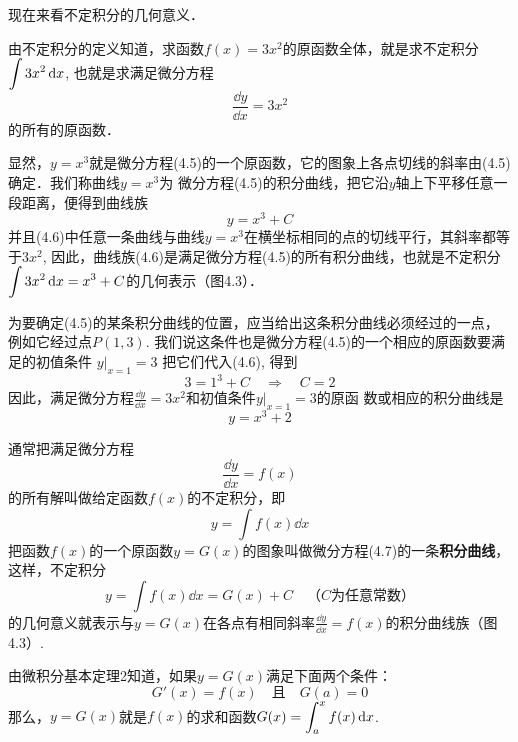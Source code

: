 现在来看不定积分的几何意义．

由不定积分的定义知道，求函数$f(x)=3x^2$的原函数全体，就是求不定积分$\displaystyle\int 3x^2\,{\rm d} x$, 也就是求满足微分方程
\begin{equation}
    \frac{\dd y}{\dd x}=3x^2
\end{equation}
的所有的原函数．

显然，$y=x^3$就是微分方程(4.5)的一个原函数，它的图象上各点切线的斜率由(4.5)确定．我们称曲线$y=x^3$为
微分方程(4.5)的积分曲线，把它沿$y$轴上下平移任意一段距离，便得到曲线族
\begin{equation}
    y=x^3+C
\end{equation}
并且(4.6)中任意一条曲线与曲线$y=x^3$在横坐标相同的点的切线平行，其斜率都等于$3x^2$, 因此，曲线族(4.6)是满足微分方程(4.5)的所有积分曲线，也就是不定积分$\displaystyle\int 3x^2\,{\rm d} x=x^3+C$的几何表示（图4.3）．

为要确定(4.5)的某条积分曲线的位置，应当给出这条积分曲线必须经过的一点，例如它经过点$P(1, 3)$. 我们说这条件也是微分方程(4.5)的一个相应的原函数要满足的初值条件
$y\big|_{x=1}=3$
把它们代入(4.6), 得到
\[3=1^3+C\quad \Rightarrow\quad C=2\]
因此，满足微分方程$\frac{\dd y}{\dd x}=3x^2$和初值条件$y\big|_{x=1}=3$的原函
数或相应的积分曲线是
\[y=x^3+2\]

通常把满足微分方程
\begin{equation}
\frac{\dd y}{\dd x}=f(x)
\end{equation}
的所有解叫做给定函数$f(x)$的不定积分，即
\[y=\int f(x)\dd x\]
把函数$f(x)$的一个原函数$y=G(x)$的图象叫做微分方程(4.7)的一条\textbf{积分曲线}，这样，不定积分
\[y=\int f(x)\dd x=G(x)+C \quad \text{（$C$为任意常数）}\]
的几何意义就表示与$y=G(x)$在各点有相同斜率$\frac{\dd y}{\dd x}=f(x)$的积分曲线族（图4.3）.
\begin{figure}[htp]
    \centering
{}
    \caption{}
\end{figure}

由微积分基本定理2知道，如果$y=G(x)$满足下面两个条件：
\[G'(x)=f(x)\quad \text{且}\quad G(a)=0\]
那么，$y=G(x)$就是$f(x)$的求和函数$G(x)=\displaystyle\int^x_a f(x)\,{\rm d} x$.

